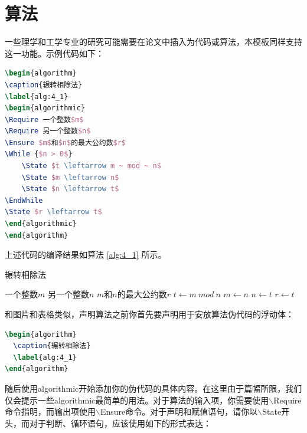 \section{算法}

一些理学和工学专业的研究可能需要在论文中插入为代码或算法，本模板同样支持这一功能。示例代码如下：

\begin{tcolorbox}
\begin{lstlisting}[language=TeX]
\begin{algorithm}
\caption{辗转相除法}
\label{alg:4_1}
\begin{algorithmic}
\Require 一个整数$m$
\Require 另一个整数$n$
\Ensure $m$和$n$的最大公约数$r$
\While {$n > 0$}
    \State $t \leftarrow m ~ mod ~ n$
    \State $m \leftarrow n$
    \State $n \leftarrow t$
\EndWhile
\State $r \leftarrow t$
\end{algorithmic}
\end{algorithm}
\end{lstlisting}
\end{tcolorbox}

\noindent 上述代码的编译结果如算法 \ref{alg:4_1} 所示。

\begin{algorithm}
\caption{辗转相除法}
\label{alg:4_1}
\begin{algorithmic}
\Require 一个整数$m$
\Require 另一个整数$n$
\Ensure $m$和$n$的最大公约数$r$
    \State $t \leftarrow m ~ mod ~ n$
    \State $m \leftarrow n$
    \State $n \leftarrow t$
\EndWhile
\State $r \leftarrow t$
\end{algorithmic}
\end{algorithm}

和图片和表格类似，声明算法之前你首先要声明用于安放算法伪代码的浮动体：

\begin{tcolorbox}
\begin{lstlisting}[language=TeX]
\begin{algorithm}
  \caption{辗转相除法}
  \label{alg:4_1}
\end{algorithm}
\end{lstlisting}
\end{tcolorbox}

\noindent 随后使用{\codefont algorithmic}开始添加你的伪代码的具体内容。在这里由于篇幅所限，我们仅会提示一些{\codefont algorithmic}最简单的用法。对于算法的输入项，你需要使用{\codefont $\backslash$Require}命令指明，而输出项使用{\codefont $\backslash$Ensure}命令。对于声明和赋值语句，请你以{\codefont $\backslash$State}开头，而对于判断、循环语句，应该使用如下的形式表达：

